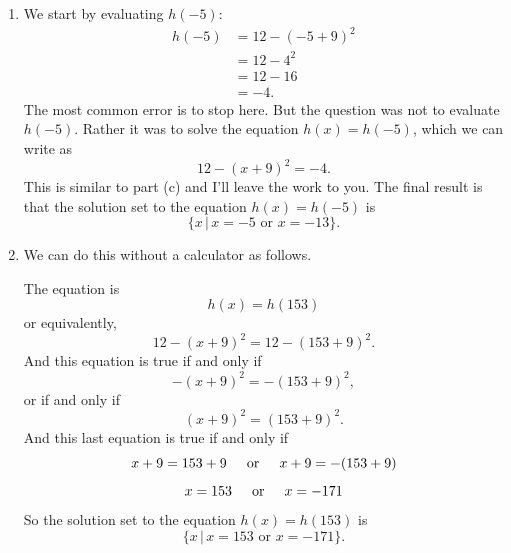 \documentclass{ximera}
\begin{document}
\begin{question}
\begin{explanation}
\begin{enumerate}
\item We start by evaluating $h(-5)$:
\begin{align*}
 h(-5) &= 12 - (-5+9)^2 \\
         &= 12 -4^2 \\ 
         &= 12 - 16  \\
         &= -4.
\end{align*}
The most common error is to stop here. But the question was not to evaluate $h(-5)$. Rather it was to solve the equation $h(x)=h(-5)$, which we can write as
\[
    12 -  (x+9)^2 = -4 .
\]
This is similar to part (c) and I'll leave the work to you. The final result is that the solution set to the equation $h(x) = h(-5)$ is
\[
   \{x \, | \, x=-5 \text{ or } x=-13   \}.
\]

\item We can do this without a calculator as follows.

The equation is
\[
   h(x) = h(153)
\]
or equivalently,
\[
  12 -  (x+9)^2 = 12 -  (153+9)^2 .
\]
And this equation is true if and only if
\[
   -  (x+9)^2 = -  (153+9)^2 ,
\]
or if and only if
\[
  (x+9)^2 = (153+9)^2.
\]
And this last equation is true if and only if
\[
   x+9 = 153+9 \hskip 0.2 in \text{or} \hskip 0.2 in x+9 = -(153+9)
\]
\[
      x = 153  \hskip 0.2 in \text{or} \hskip 0.2 in x = -171
\]
So the solution set to the equation $h(x) = h(153)$ is
\[
   \{x \, | \, x=153 \text{ or } x=-171  \}.
\]

\end{enumerate}


\end{explanation}

\end{question}
\end{document}
